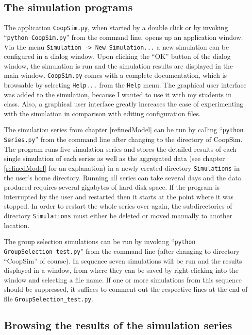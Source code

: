 \subsection{The simulation programs}

The application {\tt CoopSim.py}, when started by a double click or by invoking
``{\tt python CoopSim.py}'' from the command line, opens up an application
window. Via the menu {\tt Simulation -> New Simulation...} a new simulation can
be configured in a dialog window. Upon clicking the ``OK'' button of the dialog
window, the simulation is run and the simulation results are displayed in the
main window. {\tt CoopSim.py} comes with a complete documentation, which is
browsable by selecting {\tt Help...} from the {\tt Help} menu. The graphical
user interface was added to the simulation, because I wanted to use it with my
students in class. Also, a graphical user interface greatly increases the ease
of experimenting with the simulation in comparison with editing configuration
files.

The simulation series from chapter \ref{refinedModel} can be run by calling
``{\tt python Series.py}'' from the command line after changing to the
directory of CoopSim. The program runs five simulation series and stores the
detailed results of each single simulation of each series as well as the
aggregated data (see chapter \ref{refinedModel} for an explanation) in a newly
created directory {\tt Simulations} in the user's home directory. Running all
series can take several days and the data produced requires several gigabytes
of hard disk space. If the program is interrupted by the user and restarted
then it starts at the point where it was stopped. In order to restart the
whole series over again, the subdirectories of directory {\tt Simulations}
must either be deleted or moved manually to another location.

The group selection simulations can be run by invoking ``{\tt python
GroupSelection\_test.py}'' from the command line (after changing to directory
``CoopSim'' of course). In sequence seven simulations will be run and the
results displayed in a window, from where they can be saved by right-clicking
into the window and selecting a file name. If one or more simulations from this
sequence should be suppressed, it suffices to comment out the respective lines
at the end of file {\tt GroupSelection\_test.py}.

\subsection{Browsing the results of the simulation series}

